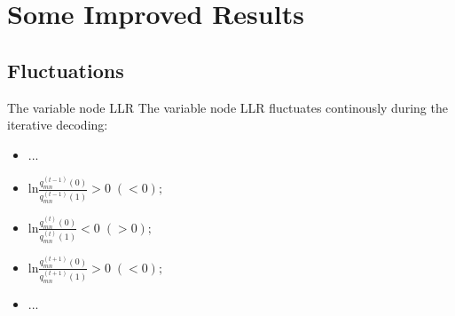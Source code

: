 \documentclass{beamer}
\begin{document}
\section{Some Improved Results}

\subsection{Fluctuations}
\begin{frame}
    \begin{block}{The variable node LLR}
        The variable node LLR fluctuates continously during the iterative
        decoding:
        \begin{itemize}
        \item \quad...
        \item ln$\frac{q_{mn}^{(t-1)}(0)}{q_{mn}^{(t-1)}(1)}>0 \;(<0);$
        \item ln$\frac{q_{mn}^{(t)}(0)}{q_{mn}^{(t)}(1)}<0 \;(>0);$
        \item ln$\frac{q_{mn}^{(t+1)}(0)}{q_{mn}^{(t+1)}(1)}>0 \;(<0);$
        \item \quad...
        \end{itemize}
    \end{block}
\end{frame}
\end{document}
